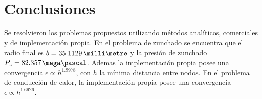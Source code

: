 \section{Conclusiones}
Se resolvieron los problemas propuestos utilizando m\'etodos anal\'iticos, comerciales y de implementaci\'on propia. En el problema de zunchado se encuentra que el radio final es $ b=35.1129\,\milli\metre $ y la presi\'on de zunchado $P_z=82.357\,\mega\pascal$. Ademas la implementaci\'on propia posee una convergencia $\epsilon\propto h^{1.9978}$, con $h$ la m\'inima distancia entre nodos. En el problema de conducci\'on de calor, la implementaci\'on propia posee una convergencia $\epsilon\propto h^{1.6926}$.